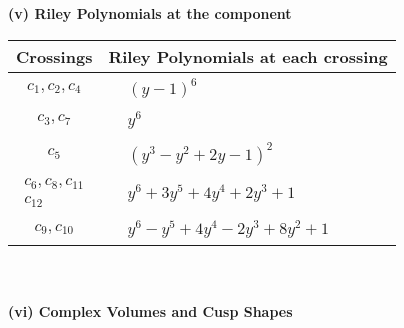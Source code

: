 \documentclass[1p]{elsarticle_modified}
\theoremstyle{definition}
\begin{document}
\newpage\renewcommand{\arraystretch}{1}
\flushleft \textbf{(v) Riley Polynomials at the component}\newline \\
\begin{tabular}{m{50pt}|m{274pt}}
Crossings & \hspace{64pt}Riley Polynomials at each crossing \\
\hline $$\begin{aligned}c_{1},c_{2},c_{4}\end{aligned}$$&$\begin{aligned}
&(y-1)^6
\end{aligned}$\\
\hline $$\begin{aligned}c_{3},c_{7}\end{aligned}$$&$\begin{aligned}
&y^6
\end{aligned}$\\
\hline $$\begin{aligned}c_{5}\end{aligned}$$&$\begin{aligned}
&(y^3- y^2+2 y-1)^2
\end{aligned}$\\
\hline $$\begin{aligned}c_{6},c_{8},c_{11}\\c_{12}\end{aligned}$$&$\begin{aligned}
&y^6+3 y^5+4 y^4+2 y^3+1
\end{aligned}$\\
\hline $$\begin{aligned}c_{9},c_{10}\end{aligned}$$&$\begin{aligned}
&y^6- y^5+4 y^4-2 y^3+8 y^2+1
\end{aligned}$\\
\hline
\end{tabular}\\~\\
\newpage\flushleft \textbf{(vi) Complex Volumes and Cusp Shapes}
\end{document}
